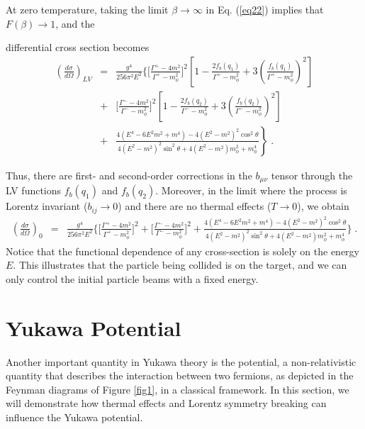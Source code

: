 \documentclass[11pt,showpacs,preprintnumbers,amsmath,amssymb,prd,nofootinbib,superscriptaddress]{revtex4-2}
\begin{document}
At zero temperature, taking the limit $\beta \to \infty$ in Eq. (\ref{eq22}) implies that $F(\beta) \to 1$, and the {differential cross section  becomes
{\color{red} \begin{eqnarray}
\left(\frac{d\sigma}{d\Omega}\right)_{LV}&=&\frac{g^4}{256\pi^2 E^2}\biggl\{\biggl[\frac{\Gamma^{+}-4m^2}{\Gamma^{+}-m_\phi^2}\biggr]^2\left[1-\frac{2f_b(q_1)}{\Gamma^{+}-m_\phi^2}+3\left(\frac{f_b(q_1)}{\Gamma^{+}-m_\phi^2}\right)^2\right]\nonumber\\&+&\biggl[\frac{\Gamma^{-}-4m^2}{\Gamma^{-}-m_\phi^2}\biggr]^2\left[1-\frac{2f_b(q_2)}{\Gamma^{-}-m_\phi^2}+3\left(\frac{f_b(q_2)}{\Gamma^{-}-m_\phi^2}\right)^2\right]\nonumber\\ &+&\left.\frac{4(E^4-6E^2m^2+m^4)-4(E^2-m^2)^2\cos^2{\theta}}{4(E^2-m^2)^2\sin^2{\theta}+4(E^2-m^2)m_\phi^2+m_\phi^4}\right\}\;.\end{eqnarray}}



Thus, there are first- and second-order corrections in the $b_{\mu \nu}$ tensor through the { LV functions $f_b(q_1)$ and $f_b(q_2)$}. Moreover, in the limit where the process is Lorentz invariant ($b_{ij} \to 0$) and there are no thermal effects ($T \to 0$), we obtain
\small{{\color{red}\begin{eqnarray}
   \left(\frac{d\sigma}{d\Omega}\right)_{0}&=&\frac{g^4}{256\pi^2 E^2}\biggl\{\biggl[\frac{\Gamma^{+}-4m^2}{\Gamma^{+}-m_\phi^2}\biggr]^2+\biggl[\frac{\Gamma^{-}-4m^2}{\Gamma^{-}-m_\phi^2}\biggr]^2+\frac{4(E^4-6E^2m^2+m^4)-4(E^2-m^2)^2\cos^2{\theta}}{4(E^2-m^2)^2\sin^2{\theta}+4(E^2-m^2)m_\phi^2+m_\phi^4}\biggr\}\;.
\end{eqnarray}}}
Notice that the functional dependence of any cross-section is solely on the energy $E$. This illustrates that the particle being collided is on the target, and we can only control the initial particle beams with a fixed energy.




\section{Yukawa Potential}\label{secpotential}

Another important quantity in Yukawa theory is the potential, a non-relativistic quantity that describes the interaction between two fermions, as depicted in the Feynman diagrams of Figure \ref{fig1}, in a classical framework. In this section, we will demonstrate how thermal effects and Lorentz symmetry breaking \cite{altschul} can influence the Yukawa potential.

}
\end{document}
